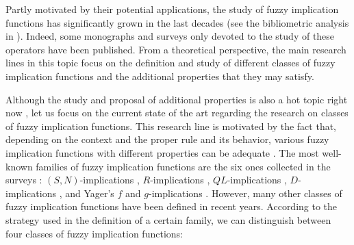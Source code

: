 Partly motivated by their potential applications, the study of fuzzy implication functions has significantly grown in the last decades (see the bibliometric analysis in \cite{Laenge2021}). Indeed, some monographs \cite{Baczynski2008,Baczynski2013} and surveys \cite{Mas2007,Baczynski2008B,Baczynski2015} only devoted to the study of these operators have been published. From a theoretical perspective, the main research lines in this topic focus on the definition and study of different classes of fuzzy implication functions and the additional properties that they may satisfy. 

Although the study and proposal of additional properties is also a hot topic right now \cite{Baczynski2022C,Zhou2022B,Mis2022,Dombi2021B,Baczynski2020,Baczynski2020B,Peng2020B}, let us focus on the current state of the art regarding the research on classes of fuzzy implication functions. This research line is motivated by the fact that, depending on the context and the proper rule and its behavior, various fuzzy implication functions with different properties can be adequate \cite{Trillas2008}. The most well-known families of fuzzy implication functions are the six ones collected in the surveys \cite{Mas2007,Baczynski2008B,Baczynski2015}: $(S,N)$-implications \cite{Trillas1985}, $R$-implications \cite{Trillas1985}, $QL$-implications \cite{Mas2006}, $D$-implications \cite{Mas2006}, and Yager's $f$ and $g$-implications \cite{Yager2004}. However, many other classes of fuzzy implication functions have been defined in recent years. According to the strategy used in the definition of a certain family, we can distinguish between four classes of fuzzy implication functions:
